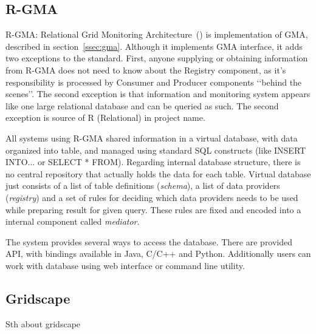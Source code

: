 \subsection{R-GMA}

R-GMA: Relational Grid Monitoring Architecture~(\cite{RGMA1,RGMA2,RGMA3}) is implementation of GMA, described in section~\ref{ssec:gma}. Although it implements GMA interface, it adds two exceptions to the standard. First, anyone supplying or obtaining information from R-GMA does not need to know about the Registry component, as it\rq{}s responsibility is processed by Consumer and Producer components \lq\lq{}behind the scenes\rq\rq{}. The second exception is that information and monitoring system appears like one large relational database and can be queried as such. The second exception is source of R (Relational) in project name.

All systems using R-GMA shared information in a virtual database, with data organized into table, and managed using standard SQL constructs (like INSERT INTO... or SELECT * FROM). Regarding internal database structure, there is no central repository that actually holds the data for each table. Virtual database just consists of a list of table definitions (\emph{schema}), a list of data providers (\emph{registry}) and a set of rules for deciding which data providers needs to be used while preparing result for given query. These rules are fixed and encoded into a internal component called \emph{mediator}.

The system provides several ways to access the database. There are provided API, with bindings available in Java, C/C++ and Python. Additionally users can work with database using web interface or command line utility.




\subsection{Gridscape}

Sth about gridscape \cite{GRIDSCAPE1, GRIDSCAPE2, GRIDSCAPE3}